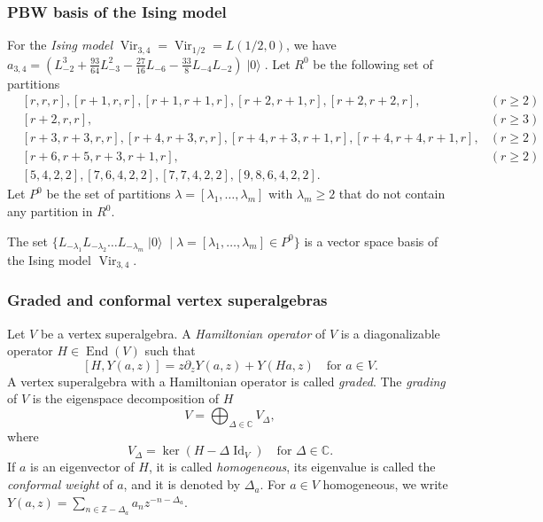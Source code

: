 \documentclass{beamer}
\DeclareMathOperator{\Vir}{Vir}
\DeclareMathOperator{\Id}{Id}
\DeclareMathOperator{\End}{End}
\DeclareMathOperator{\vac}{|0\rangle}
\begin{document}
\begin{frame}
  \frametitle{PBW basis of the Ising model}

  For the \emph{Ising model} $\Vir_{3, 4} = \Vir_{1/2} = L(1/2, 0)$, we have $a_{3, 4} = (L_{-2}^3 + \frac{93}{64}L_{-3}^2 - \frac{27}{16}L_{-6} - \frac{33}{8}L_{-4}L_{-2})\vac$.
  Let $R^0$ be the following set of partitions
  \footnotesize
  \begin{align*}
    &[r, r, r], [r + 1, r, r], [r + 1, r + 1, r], [r + 2, r + 1, r], [r + 2, r + 2, r], &(r \ge 2) \\
    &[r + 2, r, r], &(r \ge 3) \\
    &[r + 3, r + 3, r, r], [r + 4, r + 3, r, r],  [r + 4, r + 3, r + 1, r], [r + 4, r + 4, r + 1, r], &(r \ge 2) \\
    &[r + 6, r + 5, r + 3, r + 1, r], &(r \ge 2) \\
    &[5, 4, 2, 2], [7, 6, 4, 2, 2], [7, 7, 4, 2, 2], [9, 8, 6, 4, 2, 2].
  \end{align*}
  \normalsize
  Let $P^0$ be the set of partitions $\lambda = [\lambda_1, \dots, \lambda_m]$ with $\lambda_m \ge 2$ that do not contain any partition in $R^0$.

  \begin{theorem}
    \label{thr:2}
    The set $\{L_{-\lambda_1}L_{-\lambda_2}\dots L_{-\lambda_m}\vac \mid \lambda = [\lambda_1, \dots, \lambda_m] \in P^0\}$ is a vector space basis of the Ising model $\Vir_{3, 4}$.
  \end{theorem}

\end{frame}

\begin{frame}
  \frametitle{Graded and conformal vertex superalgebras}

  Let $V$ be a vertex superalgebra.
  A \emph{Hamiltonian operator} of $V$ is a diagonalizable operator $H \in \End(V)$ such that
  \begin{equation}
    \label{eq:1}
    [H, Y(a, z)] = z\partial_zY(a, z) + Y(Ha, z) \quad \text{for $a \in V$}.
  \end{equation}
  A vertex superalgebra with a Hamiltonian operator is called \emph{graded}.
  The \emph{grading} of $V$ is the eigenspace decomposition of $H$
  \begin{equation*}
    V = \bigoplus_{\Delta \in \mathbb{C}}V_{\Delta},
  \end{equation*}
  where
  \begin{equation*}
    V_{\Delta} = \ker(H - \Delta\Id_V) \quad \text{for $\Delta \in \mathbb{C}$}.
  \end{equation*}
  If $a$ is an eigenvector of $H$, it is called \emph{homogeneous}, its eigenvalue is called the \emph{conformal weight} of $a$, and it is denoted by $\Delta_a$.
  For $a \in V$ homogeneous, we write $Y(a, z) = \sum_{n \in \mathbb{Z} - \Delta_a}a_nz^{-n - \Delta_a}$.

\end{frame}
\end{document}
